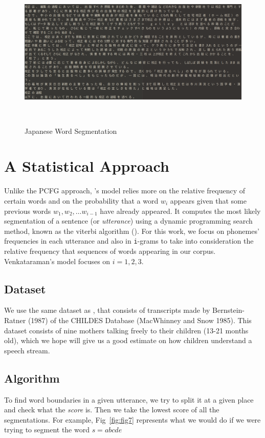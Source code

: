 \documentclass{article}
\begin{document}
\begin{figure}[h!]
  \centering
  \includegraphics[width=\columnwidth]{figures/Japanese_data.png}
  \caption{Japanese Word Segmentation}~\label{fig:figure6}
\end{figure}
\section{A Statistical Approach}

Unlike the PCFG approach, \citet{Venkataraman}'s model relies more on the relative frequency of certain words and on the probability that a word $w_i$ appears given that some previous words $w_1, w_2, \dots w_{i-1}$ have already appeared. It computes the most likely segmentation of a sentence (or \textit{utterance}) using a dynamic programming search method, known as the viterbi algorithm (\citet{viterbi}). For this work, we focus on phonemes' frequencies in each utterance and also in \texttt{i}-grams to take into consideration the relative frequency that sequences of words appearing in our corpus. Venkataraman's model focuses on $i= 1, 2, 3$.
\subsection{Dataset}
We use the same dataset as \citet{Brent}, that consists of transcripts made by Bernstein-Ratner (1987) of the CHILDES Database (MacWhinney and Snow 1985). This dataset consists of nine mothers talking freely to their children (13-21 months old), which we hope will give us a good estimate on how children understand a speech stream. 

\subsection{Algorithm}
To find word boundaries in a given utterance, we try to split it at a given place and check what the \textit{score} is. Then we take the lowest score of all the segmentations.  For example, Fig~\ref{fig:fig7} represents what we would do if we were trying to segment the word $s = abcde$
\end{document}
